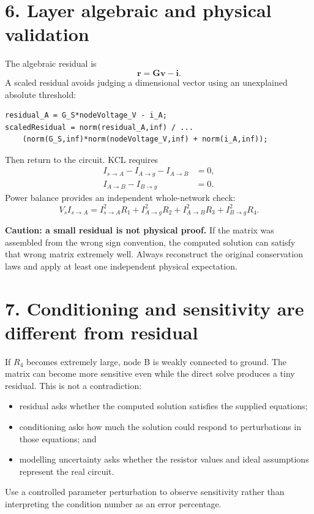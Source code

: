 \documentclass[11pt,a4paper]{article}
\begin{document}
\section*{6. Layer algebraic and physical validation}
The algebraic residual is
\begin{equation}
  \mathbf{r}=\mathbf{G}\mathbf{v}-\mathbf{i}.
\end{equation}
A scaled residual avoids judging a dimensional vector using an unexplained absolute threshold:
\begin{lstlisting}[style=matlabstyle]
residual_A = G_S*nodeVoltage_V - i_A;
scaledResidual = norm(residual_A,inf) / ...
    (norm(G_S,inf)*norm(nodeVoltage_V,inf) + norm(i_A,inf));
\end{lstlisting}

Then return to the circuit. KCL requires
\begin{align}
 I_{s\to A}-I_{A\to g}-I_{A\to B}&=0,\\
 I_{A\to B}-I_{B\to g}&=0.
\end{align}
Power balance provides an independent whole-network check:
\begin{equation}
  V_sI_{s\to A}=I_{s\to A}^2R_1+I_{A\to g}^2R_2+I_{A\to B}^2R_3+I_{B\to g}^2R_4.
\end{equation}

\begin{aibox}
\textbf{Caution: a small residual is not physical proof.} If the matrix was assembled from the wrong sign convention, the computed solution can satisfy that wrong matrix extremely well. Always reconstruct the original conservation laws and apply at least one independent physical expectation.
\end{aibox}

\section*{7. Conditioning and sensitivity are different from residual}
If $R_4$ becomes extremely large, node B is weakly connected to ground. The matrix can become more sensitive even while the direct solve produces a tiny residual. This is not a contradiction:
\begin{itemize}[nosep,leftmargin=5mm]
  \item residual asks whether the computed solution satisfies the supplied equations;
  \item conditioning asks how much the solution could respond to perturbations in those equations; and
  \item modelling uncertainty asks whether the resistor values and ideal assumptions represent the real circuit.
\end{itemize}
Use a controlled parameter perturbation to observe sensitivity rather than interpreting the condition number as an error percentage.
\end{document}
